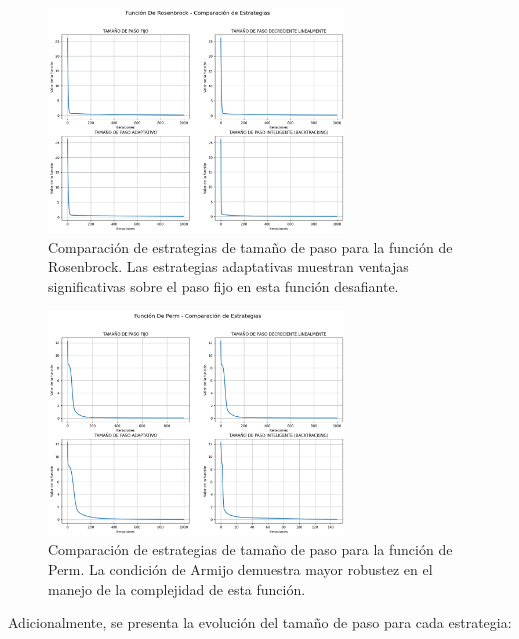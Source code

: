\documentclass{article}
\begin{document}
\begin{figure}[H]
\centering
\includegraphics[width=0.7\textwidth]{images/8_rosenbrock.png}
\caption{Comparación de estrategias de tamaño de paso para la función de Rosenbrock. Las estrategias adaptativas muestran ventajas significativas sobre el paso fijo en esta función desafiante.}
\label{fig:step_strategies_rosenbrock}
\end{figure}

\begin{figure}[H]
\centering
\includegraphics[width=0.7\textwidth]{images/8_perm.png}
\caption{Comparación de estrategias de tamaño de paso para la función de Perm. La condición de Armijo demuestra mayor robustez en el manejo de la complejidad de esta función.}
\label{fig:step_strategies_perm}
\end{figure}

Adicionalmente, se presenta la evolución del tamaño de paso para cada estrategia:
\end{document}
